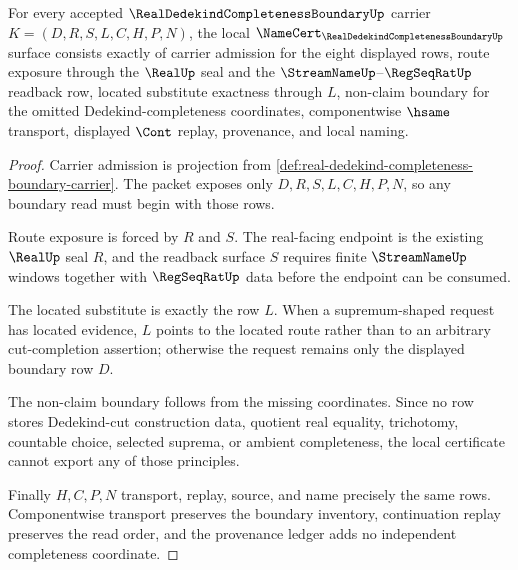 \begin{theorem}
\label{thm:real-dedekind-completeness-boundary-namecert-obligations}
For every accepted $\RealDedekindCompletenessBoundaryUp$ carrier $K=(D,R,S,L,C,H,P,N)$, the local $\NameCert_{\RealDedekindCompletenessBoundaryUp}$ surface consists exactly of carrier admission for the eight displayed rows, route exposure through the $\RealUp$ seal and the $\StreamNameUp$--$\RegSeqRatUp$ readback row, located substitute exactness through $L$, non-claim boundary for the omitted Dedekind-completeness coordinates, componentwise $\hsame$ transport, displayed $\Cont$ replay, provenance, and local naming.
\end{theorem}
\begin{proof}
Carrier admission is projection from \autoref{def:real-dedekind-completeness-boundary-carrier}. The packet exposes only $D,R,S,L,C,H,P,N$, so any boundary read must begin with those rows.

Route exposure is forced by $R$ and $S$. The real-facing endpoint is the existing $\RealUp$ seal $R$, and the readback surface $S$ requires finite $\StreamNameUp$ windows together with $\RegSeqRatUp$ data before the endpoint can be consumed.

The located substitute is exactly the row $L$. When a supremum-shaped request has located evidence, $L$ points to the located route rather than to an arbitrary cut-completion assertion; otherwise the request remains only the displayed boundary row $D$.

The non-claim boundary follows from the missing coordinates. Since no row stores Dedekind-cut construction data, quotient real equality, trichotomy, countable choice, selected suprema, or ambient completeness, the local certificate cannot export any of those principles.

Finally $H,C,P,N$ transport, replay, source, and name precisely the same rows. Componentwise transport preserves the boundary inventory, continuation replay preserves the read order, and the provenance ledger adds no independent completeness coordinate.
\end{proof}


